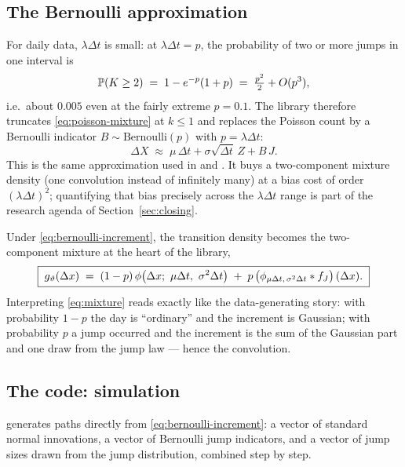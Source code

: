 \subsection{The Bernoulli approximation}
\label{sec:bernoulli}

\begin{decision}
\label{dec:bernoulli}
For daily data, $\lambda \Delta t$ is small: at $\lambda \Delta t = p$,
the probability of two or more jumps in one interval is
\[
  \mathbb{P}(K \ge 2) \;=\; 1 - e^{-p}(1 + p) \;=\; \tfrac{p^2}{2} + O(p^3),
\]
i.e.\ about $0.005$ even at the fairly extreme $p = 0.1$. The library
therefore truncates \eqref{eq:poisson-mixture} at $k \le 1$ and replaces
the Poisson count by a Bernoulli indicator $B \sim \mathrm{Bernoulli}(p)$
with $p = \lambda \Delta t$:
\begin{equation}
  \Delta X \;\approx\; \mu\,\Delta t + \sigma \sqrt{\Delta t}\, Z + B\,J .
  \label{eq:bernoulli-increment}
\end{equation}
This is the same approximation used in \citet{Ospina2009} and
\citet{Ardia2011}. It buys a two-component mixture density (one
convolution instead of infinitely many) at a bias cost of order
$(\lambda\Delta t)^2$; quantifying that bias precisely across the
$\lambda \Delta t$ range is part of the research agenda of
Section~\ref{sec:closing}.
\end{decision}

Under \eqref{eq:bernoulli-increment}, the transition density becomes the
two-component mixture at the heart of the library,
\begin{equation}
  \boxed{\;
  g_{\vartheta}(\Delta x)
  \;=\;
  (1 - p)\,\phi\!\left(\Delta x;\ \mu\Delta t,\ \sigma^2 \Delta t\right)
  \;+\;
  p \left( \phi_{\mu\Delta t,\,\sigma^2\Delta t} * f_J \right)(\Delta x).
  \;}
  \label{eq:mixture}
\end{equation}
Interpreting \eqref{eq:mixture} reads exactly like the data-generating
story: with probability $1-p$ the day is ``ordinary'' and the increment is
Gaussian; with probability $p$ a jump occurred and the increment is the sum
of the Gaussian part and one draw from the jump law --- hence the
convolution.

\subsection{The code: simulation}

 generates paths directly from
\eqref{eq:bernoulli-increment}: a vector of standard normal innovations, a
vector of Bernoulli jump indicators, and a vector of jump sizes drawn from
the jump distribution, combined step by step.


